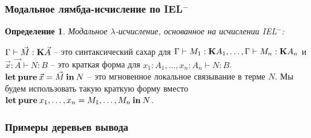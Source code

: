 \documentclass[10pt,pdf,utf8,russian,aspectratio=169]{beamer}
\newtheorem{defin}{Определение}
\begin{document}
\begin{frame}
  \frametitle{Модальное лямбда-исчисление по IEL$^{-}$}

  \begin{defin} Модальное $\lambda$-исчисление, основанное на исчислении IEL$^{-}$:
      \begin{prooftree}
      \end{prooftree}

    \begin{prooftree}
    \end{prooftree}
  \end{defin}

  $\Gamma \vdash \vec{M} : {\bf K} \vec{A}$ -- это синтаксический сахар для $\Gamma \vdash M_1 : {\bf K}A_1,\dots,\Gamma \vdash M_n : {\bf K}A_n$ и $\vec{x} : \vec{A} \vdash N : B$ -- это краткая форма для $x_1 : A_1, \dots, x_n : A_n \vdash N : B$.
  ${\bf let \: pure \:} \vec{x} = \vec{M} {\: \bf in \: } N$ -- это мгновенное локальное связывание в терме $N$.
  Мы будем использовать такую краткую форму вместо ${\bf let \: pure\:} x_1,\dots,x_n = M_1,\dots,M_n {\: \bf in \:} N$.

\end{frame}

\begin{frame}
  \frametitle{Примеры деревьев вывода}

  \begin{prooftree}
  \end{prooftree}

  \begin{prooftree}
  \end{prooftree}

\end{frame}
\end{document}
